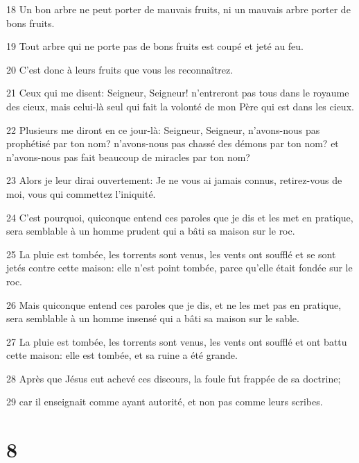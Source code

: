 \par 18 Un bon arbre ne peut porter de mauvais fruits, ni un mauvais arbre porter de bons fruits.
\par 19 Tout arbre qui ne porte pas de bons fruits est coupé et jeté au feu.
\par 20 C'est donc à leurs fruits que vous les reconnaîtrez.
\par 21 Ceux qui me disent: Seigneur, Seigneur! n'entreront pas tous dans le royaume des cieux, mais celui-là seul qui fait la volonté de mon Père qui est dans les cieux.
\par 22 Plusieurs me diront en ce jour-là: Seigneur, Seigneur, n'avons-nous pas prophétisé par ton nom? n'avons-nous pas chassé des démons par ton nom? et n'avons-nous pas fait beaucoup de miracles par ton nom?
\par 23 Alors je leur dirai ouvertement: Je ne vous ai jamais connus, retirez-vous de moi, vous qui commettez l'iniquité.
\par 24 C'est pourquoi, quiconque entend ces paroles que je dis et les met en pratique, sera semblable à un homme prudent qui a bâti sa maison sur le roc.
\par 25 La pluie est tombée, les torrents sont venus, les vents ont soufflé et se sont jetés contre cette maison: elle n'est point tombée, parce qu'elle était fondée sur le roc.
\par 26 Mais quiconque entend ces paroles que je dis, et ne les met pas en pratique, sera semblable à un homme insensé qui a bâti sa maison sur le sable.
\par 27 La pluie est tombée, les torrents sont venus, les vents ont soufflé et ont battu cette maison: elle est tombée, et sa ruine a été grande.
\par 28 Après que Jésus eut achevé ces discours, la foule fut frappée de sa doctrine;
\par 29 car il enseignait comme ayant autorité, et non pas comme leurs scribes.

\chapter{8}

